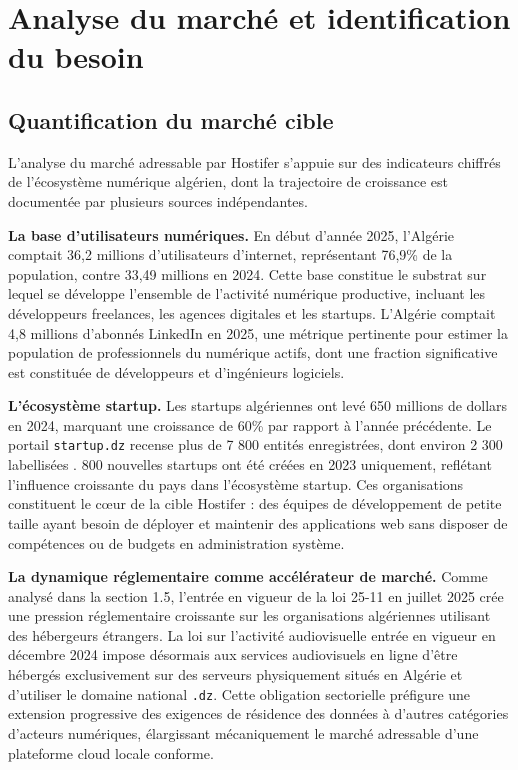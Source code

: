 
\section{Analyse du marché et identification du besoin}

\subsection*{Quantification du marché cible}

L'analyse du marché adressable par Hostifer s'appuie sur des indicateurs chiffrés de l'écosystème numérique algérien, dont la trajectoire de croissance est documentée par plusieurs sources indépendantes.

\textbf{La base d'utilisateurs numériques.} En début d'année 2025, l'Algérie comptait 36,2 millions d'utilisateurs d'internet, représentant 76,9\% de la population, contre 33,49 millions en 2024. Cette base constitue le substrat sur lequel se développe l'ensemble de l'activité numérique productive, incluant les développeurs freelances, les agences digitales et les startups. L'Algérie comptait 4,8 millions d'abonnés LinkedIn en 2025,  une métrique pertinente pour estimer la population de professionnels du numérique actifs, dont une fraction significative est constituée de développeurs et d'ingénieurs logiciels.

\textbf{L'écosystème startup.} Les startups algériennes ont levé 650 millions de dollars en 2024, marquant une croissance de 60\% par rapport à l'année précédente.  Le portail \texttt{startup.dz} recense plus de 7 800 entités enregistrées, dont environ 2 300 labellisées \cite{ecofinagency-cloud}. 800 nouvelles startups ont été créées en 2023 uniquement, reflétant l'influence croissante du pays dans l'écosystème startup.  Ces organisations constituent le c\oe ur de la cible Hostifer : des équipes de développement de petite taille ayant besoin de déployer et maintenir des applications web sans disposer de compétences ou de budgets en administration système.

\textbf{La dynamique réglementaire comme accélérateur de marché.} Comme analysé dans la section 1.5, l'entrée en vigueur de la loi 25-11 en juillet 2025 crée une pression réglementaire croissante sur les organisations algériennes utilisant des hébergeurs étrangers. La loi sur l'activité audiovisuelle entrée en vigueur en décembre 2024 impose désormais aux services audiovisuels en ligne d'être hébergés exclusivement sur des serveurs physiquement situés en Algérie et d'utiliser le domaine national \texttt{.dz}.  Cette obligation sectorielle préfigure une extension progressive des exigences de résidence des données à d'autres catégories d'acteurs numériques, élargissant mécaniquement le marché adressable d'une plateforme cloud locale conforme.

